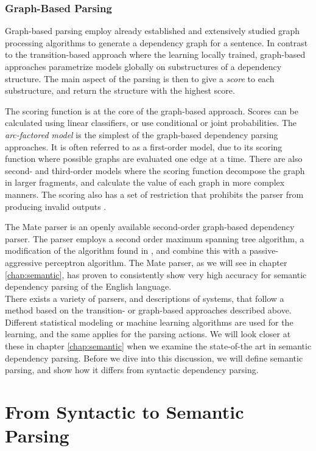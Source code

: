 \subsubsection{Graph-Based Parsing}
Graph-based parsing employ already established and extensively studied graph processing algorithms to generate a dependency graph for a sentence. In contrast to the transition-based approach where the learning locally trained, graph-based approaches parametrize models globally on substructures of a dependency structure. The main aspect of the parsing is then to give a \textit{score} to each substructure, and return the structure with the highest score. 

The scoring function is at the core of the graph-based approach. Scores can be calculated using linear classifiers, or use conditional or joint probabilities. The \textit{arc-factored model} is the simplest of the graph-based dependency parsing approaches. It is often referred to as a first-order model, due to its scoring function where possible graphs are evaluated one edge at a time. There are also second- and third-order models where the scoring function decompose the graph in larger fragments, and calculate the value of each graph in more complex manners. The scoring also has a set of restriction that prohibits the parser from producing invalid outputs \cite{KublerEtAl:09}.

The Mate parser \cite{Boh:10} is an openly available second-order graph-based dependency parser. The parser employs a second order maximum spanning tree algorithm, a modification of the algorithm found in , and combine this with a passive-aggressive perceptron algorithm. The Mate parser, as we will see in chapter \ref{chap:semantic}, has proven to consistently show very high accuracy for semantic dependency parsing of the English language.\\

\noindent There exists a variety of parsers, and descriptions of systems, that follow a method based on the transition- or graph-based approaches described above. Different statistical modeling or machine learning algorithms are used for the learning, and the same applies for the parsing actions. We will look closer at these in chapter \ref{chap:semantic} when we examine the state-of-the art in semantic dependency parsing. Before we dive into this discussion, we will define semantic parsing, and show how it differs from syntactic dependency parsing.

\section{From Syntactic to Semantic Parsing}
\label{syntactic-semantic}

